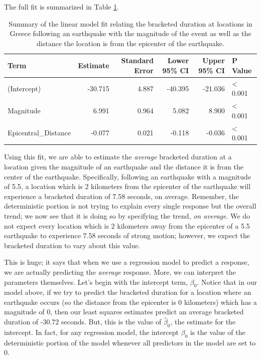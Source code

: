 \documentclass[]{book}
\theoremstyle{definition}
\theoremstyle{definition}
\theoremstyle{definition}
\theoremstyle{remark}
\begin{document}
The full fit is summarized in Table \ref{tab:regconditions-mlr-summary}.

\begin{table}

\caption{\label{tab:regconditions-mlr-summary}Summary of the linear model fit relating the bracketed duration at locations in Greece following an earthquake with the magnitude of the event as well as the distance the location is from the epicenter of the earthquake.}
\centering
\begin{tabular}[t]{l|r|r|r|r|l}
\hline
Term & Estimate & Standard Error & Lower 95\% CI & Upper 95\% CI & P Value\\
\hline
(Intercept) & -30.715 & 4.887 & -40.395 & -21.036 & < 0.001\\
\hline
Magnitude & 6.991 & 0.964 & 5.082 & 8.900 & < 0.001\\
\hline
Epicentral\_Distance & -0.077 & 0.021 & -0.118 & -0.036 & < 0.001\\
\hline
\end{tabular}
\end{table}

Using this fit, we are able to estimate the \emph{average} bracketed
duration at a location given the magnitude of an earthquake and the
distance it is from the center of the earthquake. Specifically,
following an earthquake with a magnitude of 5.5, a location which is 2
kilometers from the epicenter of the earthquake will experience a
bracketed duration of 7.58 seconds, on average. Remember, the
deterministic portion is not trying to explain every single response but
the overall trend; we now see that it is doing so by specifying the
trend, \emph{on average}. We do not expect every location which is 2
kilometers away from the epicenter of a 5.5 earthquake to experience
7.58 seconds of strong motion; however, we expect the bracketed duration
to vary about this value.

This is huge; it says that when we use a regression model to predict a
response, we are actually predicting the \emph{average} response. More,
we can interpret the parameters themselves. Let's begin with the
intercept term, \(\beta_0\). Notice that in our model above, if we try
to predict the bracketed duration for a location where an earthquake
occurs (so the distance from the epicenter is 0 kilometers) which has a
magnitude of 0, then our least squares estimates predict an average
bracketed duration of -30.72 seconds. But, this is the value of
\(\widehat{\beta}_0\), the estimate for the intercept. In fact, for any
regression model, the intercept \(\beta_0\) is the value of the
deterministic portion of the model whenever all predictors in the model
are set to 0.
\end{document}
